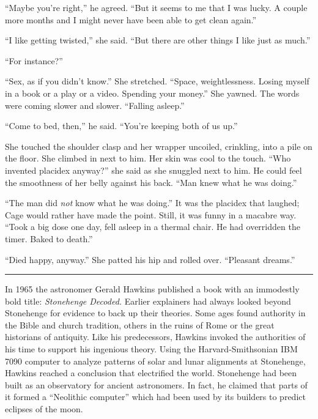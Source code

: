 ``Maybe you're right,'' he agreed. ``But it seems to me that I was lucky. A couple more months and I might never have been able to get clean again.''

``I like getting twisted,'' she said. ``But there are other things I like just as much.''

``For instance?''

``Sex, as if you didn't know.'' She stretched. ``Space, weightlessness. Losing myself in a book or a play or a video. Spending your money.'' She yawned. The words were coming slower and slower. ``Falling asleep.''

``Come to bed, then,'' he said. ``You're keeping both of us up.''

She touched the shoulder clasp and her wrapper uncoiled, crinkling, into a pile on the floor. She climbed in next to him. Her skin was cool to the touch. ``Who invented placidex anyway?'' she said as she snuggled next to him. He could feel the smoothness of her belly against his back. ``Man knew what he was doing.''

``The man did \textit{not} know what he was doing.'' It was the placidex that laughed; Cage would rather have made the point. Still, it was funny in a macabre way. ``Took a big dose one day, fell asleep in a thermal chair. He had overridden the timer. Baked to death.''

``Died happy, anyway.'' She patted his hip and rolled over. ``Pleasant dreams.''

\fancybreak{* * *}

In 1965 the astronomer Gerald Hawkins published a book with an immodestly bold title: \textit{Stonehenge Decoded.} Earlier explainers had always looked beyond Stonehenge for evidence to back up their theories. Some ages found authority in the Bible and church tradition, others in the ruins of Rome or the great historians of antiquity. Like his predecessors, Hawkins invoked the authorities of his time to support his ingenious theory. Using the Harvard-Smithsonian IBM 7090 computer to analyze patterns of solar and lunar alignments at Stonehenge, Hawkins reached a conclusion that electrified the world. Stonehenge had been built as an observatory for ancient astronomers. In fact, he claimed that parts of it formed a ``Neolithic computer'' which had been used by its builders to predict eclipses of the moon.

